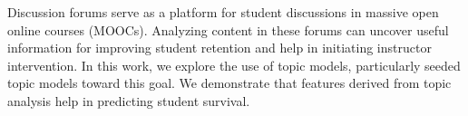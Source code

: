 Discussion forums serve as a platform for student discussions in massive open online courses (MOOCs). Analyzing content in these forums can uncover useful information for improving student retention and help in initiating instructor intervention. In this work, we explore the use of topic models, particularly seeded topic models toward this goal. We demonstrate that features derived from topic analysis help in predicting student survival.
